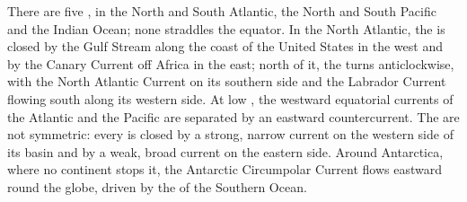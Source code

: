 There are five , in the North and South Atlantic, the North and
South Pacific and the Indian Ocean; none straddles the equator. In the North
Atlantic, the  is closed by the Gulf Stream along the coast of the
United States in the west and by the Canary Current off Africa in the east; north
of it, the  turns anticlockwise, with the North Atlantic Current on its
southern side and the Labrador Current flowing south along its western side. At low
, the westward equatorial currents of the Atlantic and the Pacific are
separated by an eastward countercurrent. The  are not symmetric: every  is
closed by a strong, narrow current on the western side of its basin and by a weak,
broad current on the eastern side. Around Antarctica, where no continent stops it,
the Antarctic Circumpolar Current flows eastward round the globe, driven by the
 of the Southern Ocean.


